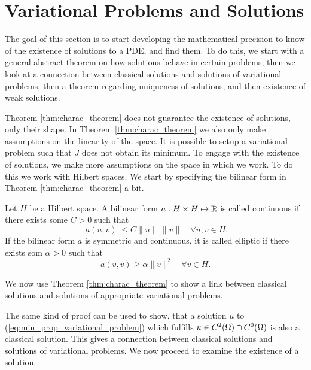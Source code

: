 \section{Variational Problems and Solutions}
The goal of this section is to start developing the mathematical 
precision to know of the existence of solutions to a PDE, and find 
them. 
To do this, we start with a general abstract theorem on how solutions 
behave in certain problems, then we look at a connection between 
classical solutions and solutions of variational problems, then a 
theorem regarding uniqueness of solutions, and then existence of 
weak solutions.


Theorem \ref{thm:charac_theorem} does not guarantee the existence 
of solutions, only their shape. In Theorem \ref{thm:charac_theorem} we 
also only make assumptions on the linearity of the space. 
It is possible to setup a variational problem such that $J$ does 
not obtain its minimum.
To engage with the existence of solutions, we make more assumptions on 
the space in which we work. To do this we work with Hilbert spaces. 
We start by specifying the bilinear form in Theorem \ref{thm:charac_theorem} 
a bit.
\begin{defn}{\quad}
   Let $H$ be a Hilbert space. A bilinear form $a : H \times H \mapsto \mathbb{R}$ is 
   called continuous if there exists some $C > 0$ such that 
   \begin{equation}
    |a(u,v)| \leq C \|u\|\, \|v\| \quad \forall u,v \in H.
    \label{eq:testte}
   \end{equation} 
   If the bilinear form $a$ is symmetric and continuous, it is called 
   elliptic if there exists som $\alpha >0$ such that 
   \begin{equation*}
    a(v,v) \geq \alpha \|v\|^2 \quad \forall v \in H.
   \end{equation*}
\end{defn}
We now use Theorem \ref{thm:charac_theorem} to show a link between classical 
solutions and solutions of appropriate variational problems.

The same kind of proof can be used to show, that a solution $u$ to 
(\ref{eq:min_prop_variational_problem}) which fulfills 
$u\in C^2(\Omega) \cap C^0(\Omega)$ is also a classical solution. 
This gives a connection between classical solutions and solutions of 
variational problems. We now proceed to examine the existence of a 
solution.
